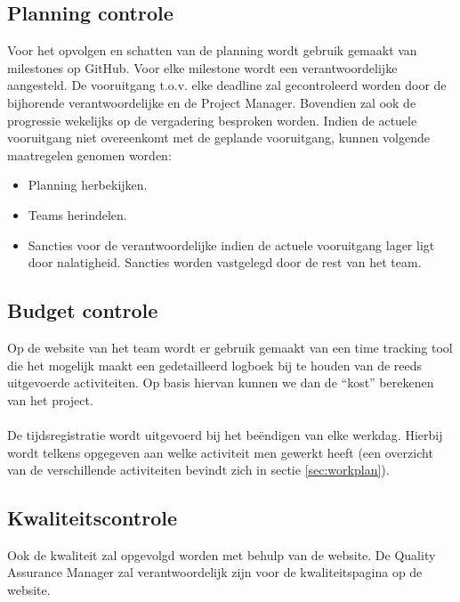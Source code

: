 \subsection{Planning controle} \label{sec:PlanningControle}
Voor het opvolgen en schatten van de planning wordt gebruik gemaakt van milestones op GitHub.  Voor elke milestone wordt een verantwoordelijke aangesteld. De vooruitgang t.o.v. elke deadline zal gecontroleerd worden door de bijhorende verantwoordelijke en de Project Manager. Bovendien zal ook de progressie wekelijks op de vergadering besproken worden. Indien de actuele vooruitgang niet overeenkomt met de geplande vooruitgang, kunnen volgende maatregelen genomen worden:
\begin{itemize}
	\item Planning herbekijken.
	\item Teams herindelen.
	\item Sancties voor de verantwoordelijke indien de actuele vooruitgang lager ligt door nalatigheid. Sancties worden vastgelegd door de rest van het team.
\end{itemize} 

\subsection{Budget controle} \label{sec:BudgetControle}
Op de website van het team \cite{portalWebsite} wordt er gebruik gemaakt van een time tracking tool die het mogelijk maakt een gedetailleerd logboek bij te houden van de reeds uitgevoerde activiteiten. Op basis hiervan kunnen we dan de ``kost'' berekenen van het project. 
\\
\\
De tijdsregistratie wordt uitgevoerd bij het be\"{e}ndigen van elke werkdag. Hierbij wordt telkens opgegeven aan welke activiteit men gewerkt heeft (een overzicht van de verschillende activiteiten bevindt zich in sectie \ref{sec:workplan}).

\subsection{Kwaliteitscontrole}
Ook de kwaliteit zal opgevolgd worden met behulp van de website. De Quality Assurance Manager zal verantwoordelijk zijn voor de kwaliteitspagina op de website.

